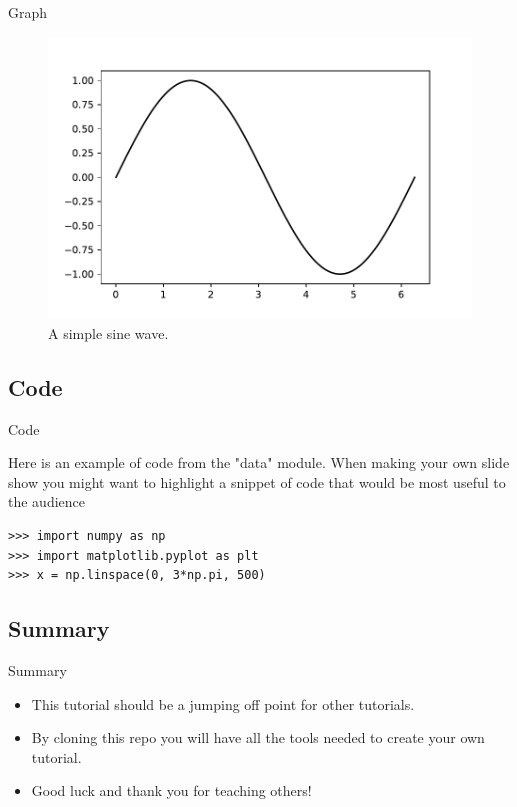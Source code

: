\documentclass{beamer}
\begin{document}
\begin{frame}{Graph}

\begin{figure}
\includegraphics[width=\textwidth]{figs/sin} 
\caption{\label{fig:your-figure} A simple sine wave.}
\end{figure}

\end{frame}{}

\subsection{Code}

\begin{frame}[fragile]{Code}

Here is an example of code from the "data" module. When making your own slide show you might want to highlight a snippet of code that would be most useful to the audience 

\begin{verbatim}
>>> import numpy as np
>>> import matplotlib.pyplot as plt
>>> x = np.linspace(0, 3*np.pi, 500)
\end{verbatim}

\end{frame}

\subsection{Summary}

\begin{frame}{Summary}

\begin{itemize}
\item This tutorial should be a jumping off point for other tutorials. 
\item By cloning this repo you will have all the tools needed to create your own tutorial.
\item Good luck and thank you for teaching others!
\end{itemize}

\end{frame}
\end{document}
